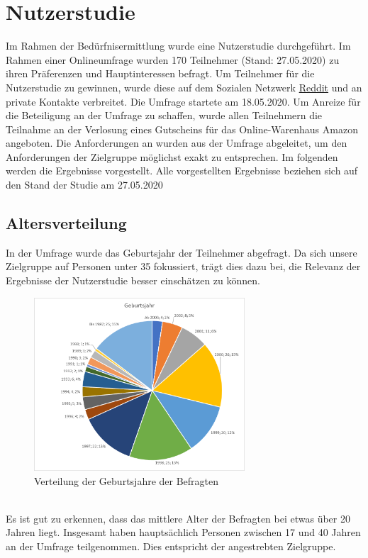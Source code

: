 \section{Nutzerstudie}
Im Rahmen der Bedürfnisermittlung wurde eine Nutzerstudie durchgeführt. Im Rahmen einer Onlineumfrage wurden 170 Teilnehmer (Stand: 27.05.2020) zu ihren Präferenzen und Hauptinteressen befragt.
Um Teilnehmer für die Nutzerstudie zu gewinnen, wurde diese auf dem Sozialen Netzwerk \href{https://www.reddit.com/}{Reddit} und an private Kontakte verbreitet. Die Umfrage startete am 18.05.2020. Um Anreize für die Beteiligung an der Umfrage zu schaffen, wurde allen Teilnehmern die Teilnahme an der Verlosung eines Gutscheins für das Online-Warenhaus Amazon angeboten.
Die Anforderungen an \softwarename wurden aus der Umfrage abgeleitet, um den Anforderungen der Zielgruppe möglichst exakt zu entsprechen.
Im folgenden werden die Ergebnisse vorgestellt.
Alle vorgestellten Ergebnisse beziehen sich auf den Stand der Studie am 27.05.2020\\

\subsection{Altersverteilung}
In der Umfrage wurde das Geburtsjahr der Teilnehmer abgefragt. Da sich unsere Zielgruppe auf Personen unter 35 fokussiert, trägt dies dazu bei, die Relevanz der Ergebnisse der Nutzerstudie besser einschätzen zu können.
\\
\begin{figure}[h]
    \centering
    \includegraphics[width=0.7\textwidth]{media/diagram/geburtsjahr.png}
    \caption{Verteilung der Geburtsjahre der Befragten}
\end{figure}
\\
Es ist gut zu erkennen, dass das mittlere Alter der Befragten bei etwas über 20 Jahren liegt. Insgesamt haben hauptsächlich Personen zwischen 17 und 40 Jahren an der Umfrage teilgenommen.
Dies entspricht der angestrebten Zielgruppe.
